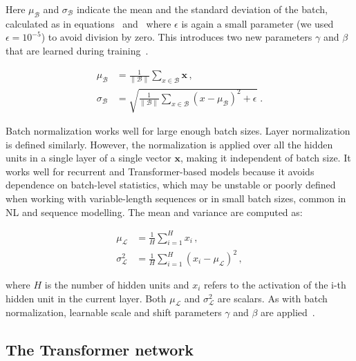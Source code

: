 \noindent Here $\mu_{\mathcal{B}}$ and $\sigma_{\mathcal{B}}$ indicate the mean and the standard deviation of the batch, calculated as in equations~ and~ where $\epsilon$ is again a small parameter (we used $\epsilon = 10^{-5}$) to avoid division by zero.
This introduces two new parameters $\gamma$ and $\beta$ that are learned during training~\cite{zhang_dive_2023, murphy_probabilistic_2022}.

\begin{align}
\label{eq:BN_mean}
	\mu_{\mathcal{B}} & = \frac{1}{\|\mathcal{B}\|} \sum_{x \in \mathcal{B}} \mathbf{x} \,,\\
\label{eq:BN_std}
	\sigma_{\mathcal{B}} & = \sqrt{\frac{1}{\|\mathcal{B}\|} \sum_{x \in \mathcal{B}} \left( x - \mu_{\mathcal{B}} \right)^2 + \epsilon} \;.
\end{align}

Batch normalization works well for large enough batch sizes. Layer normalization is defined similarly. However, the normalization is applied over all the hidden units in a single layer of a single vector $\mathbf{x}$, making it independent of batch size. It works well for recurrent and Transformer-based models because it avoids dependence on batch-level statistics, which may be unstable or poorly defined when working with variable-length sequences or in small batch sizes, common in NL and sequence modelling. The mean and variance are computed as:

\begin{align}
\label{eq:LN_mean}
	\mu_{\mathcal{L}} &  = \frac{1}{H} \sum_{i=1}^{H} x_i \,, \\
\label{eq:LN_std}
	\sigma_{\mathcal{L}}^2 & = \frac{1}{H} \sum_{i=1}^H \left( x_i - \mu_{\mathcal{L}} \right)^2 \,,
\end{align}

\noindent where $H$ is the number of hidden units and $x_i$ refers to the activation of the i-th hidden unit in the current layer. Both $\mu_{\mathcal{L}}$ and $\sigma_{\mathcal{L}}^2$ are scalars. As with batch normalization, learnable scale and shift parameters $\gamma$ and $\beta$ are applied~\cite{zhang_dive_2023, ba_layer_2016}.  



\subsection{The Transformer network}

